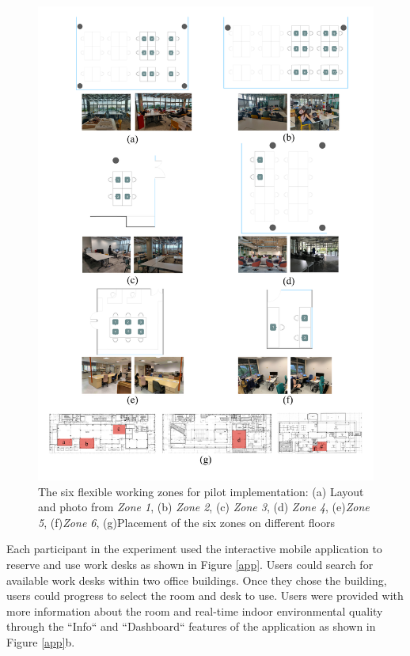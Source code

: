 \documentclass[]{interact}
\theoremstyle{plain}%
\theoremstyle{definition}
\theoremstyle{remark}
\begin{document}
\begin{figure}[ht!]
\centering
\includegraphics[scale=0.7]{figures/pilot-01.jpg}
\caption{The six flexible working zones for pilot implementation: (a) Layout and photo from \emph{Zone 1}, (b) \emph{Zone 2}, (c) \emph{Zone 3}, (d) \emph{Zone 4}, (e)\emph{Zone 5}, (f)\emph{Zone 6}, (g){Placement of the six zones on different floors}}
\label{pilot}
\end{figure}


Each participant in the experiment used the interactive mobile application to reserve and use work desks as shown in Figure \ref{app}. Users could search for available work desks within two office buildings. Once they chose the building, users could progress to select the room and desk to use. Users were provided with more information about the room and real-time indoor environmental quality through the ``Info`` and ``Dashboard`` features of the application as shown in Figure \ref{app}b. 
\end{document}
